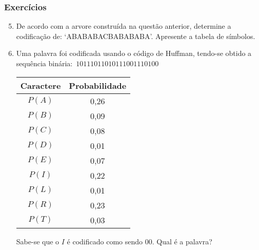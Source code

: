 \documentclass[10pt]{beamer}
\begin{document}
\begin{frame}[t]
    \frametitle{Exercícios}
    \begin{enumerate}[label=\textcircled{\scriptsize\arabic*}]
        \setcounter{enumi}{4}
        \item De acordo com a arvore construída na questão anterior, determine a codificação de: `ABABABACBABABABA'. Apresente a tabela de símbolos.
        \item Uma palavra foi codificada usando o código de Huffman, tendo-se obtido a sequência binária:\ $1 0 1 1 1 0 1 1 0 1 0 1 1 1 0 0 1 1 1 0 1 0 0$

              \begin{table}[htbp]
                  \centering
                  \begin{tabular}{c|c}
                      \textbf{Caractere} & \textbf{Probabilidade} \\
                      \hline
                      $P(A)$             & 0,26                   \\
                      $P(B)$             & 0,09                   \\
                      $P(C)$             & 0,08                   \\
                      $P(D)$             & 0,01                   \\
                      $P(E)$             & 0,07                   \\
                      $P(I)$             & 0,22                   \\
                      $P(L)$             & 0,01                   \\
                      $P(R)$             & 0,23                   \\
                      $P(T)$             & 0,03                   \\
                  \end{tabular}
              \end{table}
              Sabe-se que o $I$ é codificado como sendo 00. Qual é a palavra?
    \end{enumerate}
\end{frame}
\end{document}
